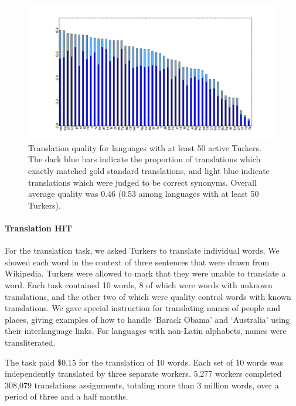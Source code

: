 \documentclass[11pt]{article}
\begin{document}
\begin{figure}[h]
\begin{center}
\includegraphics[width=0.8\linewidth]{final-figures/google-match-bar}
\caption{Translation quality for languages with at least 50 active Turkers.  The dark blue bars indicate the proportion of translations which exactly matched gold standard translations, and light blue indicate translations which were judged to be correct synonyms.  Overall average quality was 0.46 (0.53 among languages with at least 50 Turkers).}
\label{hitlangqual} 
\end{center}
\end{figure}



\paragraph{Translation HIT}

For the translation task, we asked Turkers to translate individual words.  We showed each word in the context of three sentences that were drawn from Wikipedia.  
Turkers were allowed to mark that they were unable to translate a word. Each task contained 10 words, 8 of which were words with unknown translations, and the other two of which were quality control words with known translations.   
We gave special instruction for translating names of people and places, giving examples of how to handle `Barack Obama' and `Australia' using their interlanguage links. For languages with non-Latin alphabets, names were transliterated. 

The task paid \$0.15 for the translation of 10 words.  
Each set of 10 words was independently translated by three separate workers.  5,277 workers completed 308,079 translations assignments, totaling more than 3 million words, over a period of three and a half months.
\end{document}
